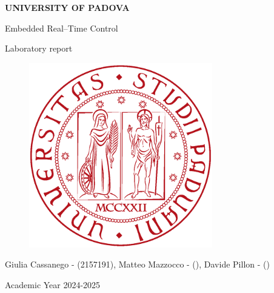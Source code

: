 \documentclass[english]{article}
\begin{document}
\begin{titlepage}

	\begin{center}
		\begin{Large} \textbf{UNIVERSITY OF PADOVA} \\
		\end{Large} \vspace{1cm}
		\vspace{3cm}
		\begin{Large} Embedded Real--Time Control \end{Large}
		\par\end{center}

	\begin{center}
		\begin{Large}Laboratory report\\
		\end{Large}
		\par\end{center}

	\begin{center}
		\vspace{2cm}
		\begin{figure}[!htb]
			\centering \includegraphics[width=8cm]{figures/unipd-logo.png}\\

		\end{figure}

		\par\end{center}

	\begin{center}
		\vspace{2cm}
		\begin{Large} Giulia Cassanego - (2157191), Matteo Mazzocco - (), Davide Pillon - ()  \\
		\end{Large} \vspace{2cm}
		\begin{Large} Academic Year 2024-2025 \end{Large}
		\par\end{center}

\end{titlepage}
\end{document}
